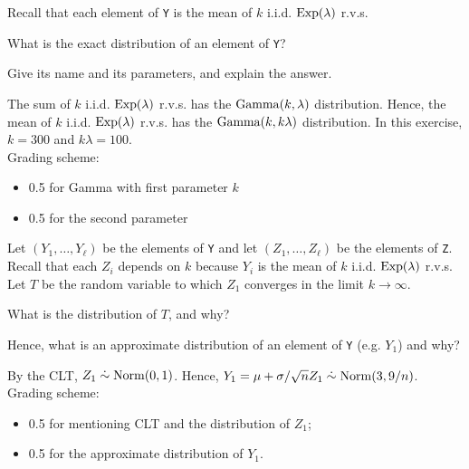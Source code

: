 \vspace*{20pt}


Recall that each element of  \texttt{Y} is the mean of $k$ i.i.d. $\mathrm{Exp}(\lambda)$ r.v.s.

\begin{exercise}[1]
What is the exact distribution of an element of \texttt{Y}? 

Give its name and its parameters, and explain the answer.
\begin{solution}
The sum of $k$ i.i.d.  $\mathrm{Exp}(\lambda)$ r.v.s. has the $\mathrm{Gamma}(k, \lambda)$ distribution.
Hence, the mean of $k$ i.i.d.  $\mathrm{Exp}(\lambda)$ r.v.s. has the $\mathrm{Gamma}(k, k\lambda)$ distribution.
In this exercise, $k=300$ and $k\lambda = 100$. \\ 
Grading scheme:
\begin{itemize}
\item 0.5 for Gamma with first parameter $k$
\item 0.5 for the second parameter
\end{itemize}
\end{solution}
\end{exercise}


\vspace*{30pt}



Let $(Y_1, \ldots, Y_{\ell})$ be the elements of \texttt{Y} and let $(Z_1, \ldots, Z_{\ell})$ be the elements of  \texttt{Z}. Recall that each $Z_i$ depends on $k$ because $Y_i$ is the mean of $k$ i.i.d. $\mathrm{Exp}(\lambda)$ r.v.s. Let $T$ be the random variable to which $Z_1$ converges in the limit  $k \to \infty$.

\begin{exercise}[1]
What is the distribution of $T$, and why? 

Hence, what is an approximate distribution of an element of \texttt{Y} (e.g. $Y_1$) and why?
\begin{solution}
By the CLT, $Z_1 \;\dot{\sim}\; \mathrm{Norm}(0,1)$. Hence,  $Y_1 = \mu + \sigma/\sqrt{n}Z_1 \;\dot{\sim}\; \mathrm{Norm}(3,9/n)$. \\ 
Grading scheme:
\begin{itemize}
\item 0.5 for mentioning CLT and the distribution of $Z_1$;
\item 0.5 for the approximate distribution of $Y_1$.
\end{itemize}
\end{solution}
\end{exercise}


